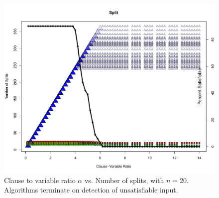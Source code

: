 \begin{figure}[htdp]

\begin{center}

\includegraphics[width=1.1\textwidth]{./figures/metricOutput_n20-earlyExit/splitCount.pdf}

\caption{Clause to variable ratio $\alpha$ vs. Number of splits, with $n = 20$.  Algorithms terminate on detection of unsatisfiable input. }
\label{splitFig_10}
\end{center}
\end{figure}


\FloatBarrier

